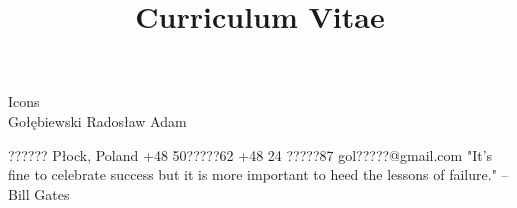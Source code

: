 %

    {Icons}
%
\familyname
    {\\ Gołębiewski}
\firstname
    {Radosław Adam}
%
\title
    {Curriculum Vitae}
%
\address
    {Czwartaków ?????}
    {?????? Płock, Poland}
%
\mobile
    {+48 50?????62}
%
\phone
    {+48 24 ?????87}
%
\email
    {gol?????@gmail.com}
%
\extrainfo
    {
        {\href{http://www.linkedin.com/pub/rados\%C5\%82aw-go\%C5\%82\%C4\%99biewski/70/832/35}
        {\linkedin}}
%
        {\href{https://github.com/golebier}
        {\github}}
%
        {\href{https://plus.google.com/103563456777990778742/about}
        {\gplus}}
%
        {\href{http://www.researchgate.net/profile/Radoslaw_Golebiewski/}
        {\researchgate}}
%
%
%
        {\href{skype:golebier}
        {\skype}}
    }
%
%        
\quote
    {"It's fine to celebrate success but it is more important to heed the lessons of failure." -- Bill Gates}
%
